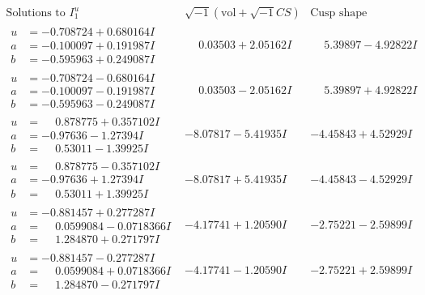 \documentclass[1p]{elsarticle_modified}
\theoremstyle{definition}
\newcommand{\I}{\sqrt{-1}}
\begin{document}
$$\begin{array}{c|c|c}  
\text{Solutions to }I^u_{1}& \I (\text{vol} + \sqrt{-1}CS) & \text{Cusp shape}\\
 \hline 
\begin{aligned}
u &= -0.708724 + 0.680164 I \\
a &= -0.100097 + 0.191987 I \\
b &= -0.595963 + 0.249087 I\end{aligned}
 & \phantom{-}0.03503 + 2.05162 I & \phantom{-}5.39897 - 4.92822 I \\ \hline\begin{aligned}
u &= -0.708724 - 0.680164 I \\
a &= -0.100097 - 0.191987 I \\
b &= -0.595963 - 0.249087 I\end{aligned}
 & \phantom{-}0.03503 - 2.05162 I & \phantom{-}5.39897 + 4.92822 I \\ \hline\begin{aligned}
u &= \phantom{-}0.878775 + 0.357102 I \\
a &= -0.97636 - 1.27394 I \\
b &= \phantom{-}0.53011 - 1.39925 I\end{aligned}
 & -8.07817 - 5.41935 I & -4.45843 + 4.52929 I \\ \hline\begin{aligned}
u &= \phantom{-}0.878775 - 0.357102 I \\
a &= -0.97636 + 1.27394 I \\
b &= \phantom{-}0.53011 + 1.39925 I\end{aligned}
 & -8.07817 + 5.41935 I & -4.45843 - 4.52929 I \\ \hline\begin{aligned}
u &= -0.881457 + 0.277287 I \\
a &= \phantom{-}0.0599084 - 0.0718366 I \\
b &= \phantom{-}1.284870 + 0.271797 I\end{aligned}
 & -4.17741 + 1.20590 I & -2.75221 - 2.59899 I \\ \hline\begin{aligned}
u &= -0.881457 - 0.277287 I \\
a &= \phantom{-}0.0599084 + 0.0718366 I \\
b &= \phantom{-}1.284870 - 0.271797 I\end{aligned}
 & -4.17741 - 1.20590 I & -2.75221 + 2.59899 I \\ \hline\begin{aligned}

\end{aligned}
\end{array}$$
\end{document}
